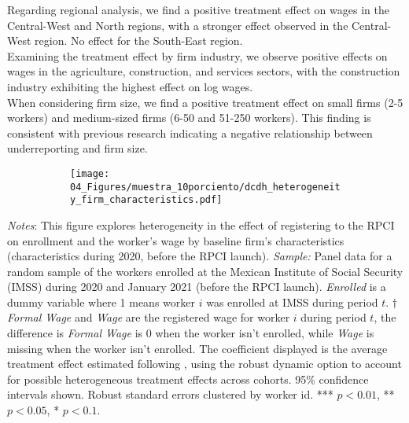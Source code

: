 \documentclass[10pt, oneside]{book}
\begin{document}
Regarding regional analysis, we find a positive treatment effect on wages in the Central-West and North regions, with a stronger effect observed in the Central-West region. No effect for the South-East region. \\

Examining the treatment effect by firm industry, we observe positive effects on wages in the agriculture, construction, and services sectors, with the construction industry exhibiting the highest effect on log wages. \\

When considering firm size, we find a positive treatment effect on small firms (2-5 workers) and medium-sized firms (6-50 and 51-250 workers). This finding is consistent with previous research indicating a negative relationship between underreporting and firm size. \\

\begin{figure}[H]
    \centering
    \caption{Heterogeneity by firm characteristics \label{fig:heterogeneity_firm_rpci}}
    
    \begin{subfigure}{\textwidth}
    \texttt{[image: 04\_Figures/muestra\_10porciento/dcdh\_heterogeneity\_firm\_characteristics.pdf]}
    \end{subfigure}
    
\end{figure}

\scriptsize{
\noindent \textit{Notes}: This figure explores heterogeneity in the effect of registering to the RPCI on enrollment and the worker's wage by baseline firm's characteristics (characteristics during 2020, before the RPCI launch). \textit{Sample:} Panel data for a random sample of the workers enrolled at the Mexican Institute of Social Security (IMSS) during 2020 and January 2021 (before the RPCI launch). \textit{Enrolled} is a dummy variable where 1 means worker $i$ was enrolled at IMSS during period $t$. $\dagger$ \textit{Formal Wage} and \textit{Wage} are the registered wage for worker $i$ during period $t$, the difference is \textit{Formal Wage} is 0 when the worker isn't enrolled, while \textit{Wage} is missing when the worker isn't enrolled. The coefficient displayed is the average treatment effect estimated following \cite{de2020two}, using the robust dynamic option to account for possible heterogeneous treatment effects across cohorts. 95\% confidence intervals shown. Robust standard errors clustered by worker id. *** $p<0.01$, ** $p<0.05$, * $p<0.1$. %
}
\end{document}
